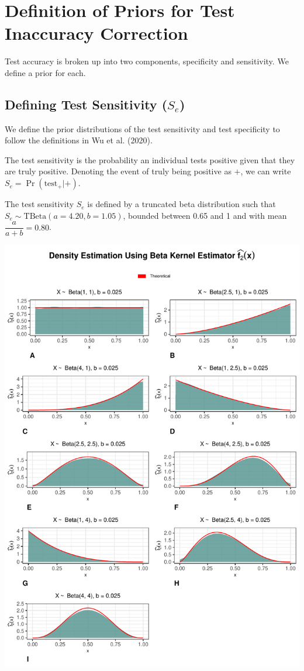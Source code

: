\documentclass[12pt,twoside]{smiththesis}
\begin{document}
\hypertarget{definition-of-priors-for-test-inaccuracy-correction}{%
\section{Definition of Priors for Test Inaccuracy Correction}\label{definition-of-priors-for-test-inaccuracy-correction}}

Test accuracy is broken up into two components, specificity and sensitivity. We define a prior for each.

\hypertarget{defining-test-sensitivity-s_e}{%
\subsection{\texorpdfstring{Defining Test Sensitivity (\(S_e\))}{Defining Test Sensitivity (S\_e)}}\label{defining-test-sensitivity-s_e}}

We define the prior distributions of the test sensitivity and test specificity to follow the definitions in Wu et al. (2020).

The test sensitivity is the probability an individual tests positive given that they are truly positive. Denoting the event of truly being positive as \(+\), we can write \(S_e = \Pr(\text{test}_+|+)\).

The test sensitivity \(S_e\) is defined by a truncated beta distribution such that \(S_e \sim \text{TBeta}(a= 4.20, b= 1.05)\), bounded between 0.65 and 1 and with mean \(\dfrac{a}{a+b} = 0.80\).
\begin{center}\includegraphics[width=0.8\linewidth]{thesis_files/figure-latex/unnamed-chunk-47-1} \end{center}
\end{document}

